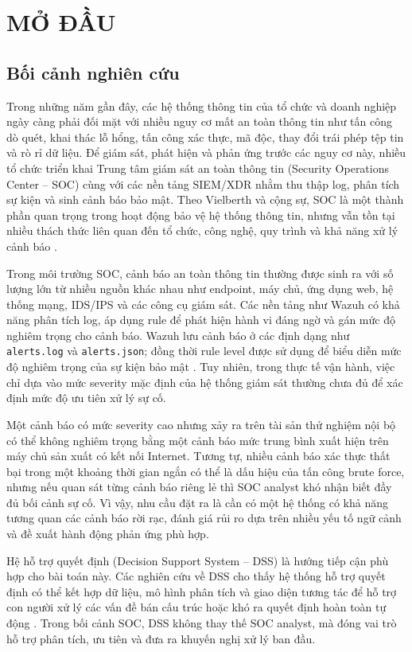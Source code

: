 \documentclass[a4paper,12pt,oneside]{book}
\begin{document}
\clearpage
{}


\chapter{\MakeTextUppercase{Mở đầu}}

\section{Bối cảnh nghiên cứu}
{\fontsize{13pt}{15.6pt}\selectfont

Trong những năm gần đây, các hệ thống thông tin của tổ chức và doanh nghiệp ngày càng phải đối mặt với nhiều nguy cơ mất an toàn thông tin như tấn công dò quét, khai thác lỗ hổng, tấn công xác thực, mã độc, thay đổi trái phép tệp tin và rò rỉ dữ liệu. Để giám sát, phát hiện và phản ứng trước các nguy cơ này, nhiều tổ chức triển khai Trung tâm giám sát an toàn thông tin (Security Operations Center -- SOC) cùng với các nền tảng SIEM/XDR nhằm thu thập log, phân tích sự kiện và sinh cảnh báo bảo mật. Theo Vielberth và cộng sự, SOC là một thành phần quan trọng trong hoạt động bảo vệ hệ thống thông tin, nhưng vẫn tồn tại nhiều thách thức liên quan đến tổ chức, công nghệ, quy trình và khả năng xử lý cảnh báo \cite{vielberth2020soc}.

\noindent Trong môi trường SOC, cảnh báo an toàn thông tin thường được sinh ra với số lượng lớn từ nhiều nguồn khác nhau như endpoint, máy chủ, ứng dụng web, hệ thống mạng, IDS/IPS và các công cụ giám sát. Các nền tảng như Wazuh có khả năng phân tích log, áp dụng rule để phát hiện hành vi đáng ngờ và gán mức độ nghiêm trọng cho cảnh báo. Wazuh lưu cảnh báo ở các định dạng như \texttt{alerts.log} và \texttt{alerts.json}; đồng thời rule level được sử dụng để biểu diễn mức độ nghiêm trọng của sự kiện bảo mật \cite{wazuhAlertManagement,wazuhRules}. Tuy nhiên, trong thực tế vận hành, việc chỉ dựa vào mức severity mặc định của hệ thống giám sát thường chưa đủ để xác định mức độ ưu tiên xử lý sự cố.

\noindent Một cảnh báo có mức severity cao nhưng xảy ra trên tài sản thử nghiệm nội bộ có thể không nghiêm trọng bằng một cảnh báo mức trung bình xuất hiện trên máy chủ sản xuất có kết nối Internet. Tương tự, nhiều cảnh báo xác thực thất bại trong một khoảng thời gian ngắn có thể là dấu hiệu của tấn công brute force, nhưng nếu quan sát từng cảnh báo riêng lẻ thì SOC analyst khó nhận biết đầy đủ bối cảnh sự cố. Vì vậy, nhu cầu đặt ra là cần có một hệ thống có khả năng tương quan các cảnh báo rời rạc, đánh giá rủi ro dựa trên nhiều yếu tố ngữ cảnh và đề xuất hành động phản ứng phù hợp.

\noindent Hệ hỗ trợ quyết định (Decision Support System -- DSS) là hướng tiếp cận phù hợp cho bài toán này. Các nghiên cứu về DSS cho thấy hệ thống hỗ trợ quyết định có thể kết hợp dữ liệu, mô hình phân tích và giao diện tương tác để hỗ trợ con người xử lý các vấn đề bán cấu trúc hoặc khó ra quyết định hoàn toàn tự động \cite{gorry1971framework,shim2002dss}. Trong bối cảnh SOC, DSS không thay thế SOC analyst, mà đóng vai trò hỗ trợ phân tích, ưu tiên và đưa ra khuyến nghị xử lý ban đầu.

}
\end{document}
